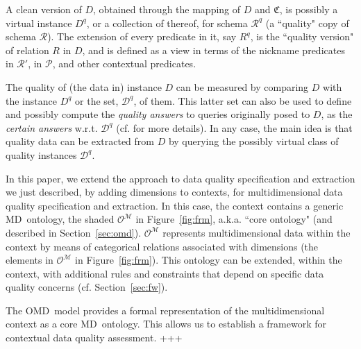 \documentclass[format=acmsmall, review=false, screen=true]{acmart}
\newcommand{\ignoreT}[1]{}
\newcommand{\mc}[1]{\mathcal{ #1}}
\newcommand{\mf}[1]{\mathfrak{ #1}}
\newcommand{\schema}{\mc{R}}
\newcommand{\omd}{OMD}
\newcommand{\md}{MD}
\begin{document}
{A clean version of $D$, obtained through the mapping of $D$ and $\mf{C}$, is possibly a virtual instance $D^q$, or a collection of thereof, for schema $\schema^q$ (a ``quality" copy of schema $\schema$). The extension of every predicate in it, say $R^q$, is the ``quality version" of relation $R$ in $D$, and is defined as a view in terms of the nickname predicates in $\schema'$, in $\mc{P}$, and other contextual predicates.


The quality of (the data in) instance $D$ can be measured by comparing $D$ with the instance $D^q$ or the set, $\mc{D}^q$, of them. This latter set can also be used to define and possibly compute the {\em quality answers} to queries originally posed to $D$\ignoreT{, as suggested in Figure \ref{fig:cleanQ}}, as the {\em certain answers} w.r.t. $\mc{D}^q$ (cf. \cite{bertossi-brite,bertossi16} for more details). In any case, the main idea is that quality data can be extracted from $D$ by querying the possibly virtual class of quality instances $\mc{D}^q$.


In this paper, we extend the approach to data quality specification and extraction we just described,  by adding dimensions to contexts, for  multidimensional data quality specification and extraction. In this case, the context contains a generic \md \ ontology, the shaded $\mc{O}^\mc{M}$ in Figure~\ref{fig:frm}, a.k.a. ``core ontology" (and described in Section~\ref{sec:omd}). $\mc{O}^\mc{M}$ represents multidimensional data within the context by means of categorical relations associated with dimensions (the elements in $\mc{O}^\mc{M}$ in Figure~\ref{fig:frm}). This ontology can be extended, within the context, with additional rules and constraints that depend on specific data quality concerns (cf. Section~\ref{sec:fw}).

The \omd \ model provides a formal representation of the multidimensional context as a core \md \ ontology. This allows us to establish a framework for contextual data quality assessment.
+++}
\end{document}
